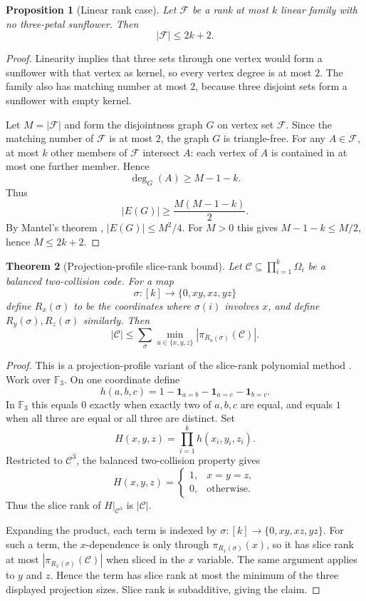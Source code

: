 \documentclass[11pt]{article}
\newtheorem{theorem}{Theorem}[section]
\newtheorem{proposition}[theorem]{Proposition}
\newcommand{\C}{\mathcal C}
\newcommand{\F}{\mathcal F}
\begin{document}
\begin{proposition}[Linear rank case]
\label{prop:linear-case}
Let $\F$ be a rank at most $k$ linear family with no three-petal sunflower.
Then
\[
  |\F|\le 2k+2.
\]
\end{proposition}

\begin{proof}
Linearity implies that three sets through one vertex would form a sunflower
with that vertex as kernel, so every vertex degree is at most $2$.  The family
also has matching number at most $2$, because three disjoint sets form a
sunflower with empty kernel.

Let $M=|\F|$ and form the disjointness graph $G$ on vertex set $\F$.  Since
the matching number of $\F$ is at most $2$, the graph $G$ is triangle-free.
For any $A\in\F$, at most $k$ other members of $\F$ intersect $A$: each vertex
of $A$ is contained in at most one further member.  Hence
\[
  \deg_G(A)\ge M-1-k.
\]
Thus
\[
  |E(G)|\ge \frac{M(M-1-k)}2.
\]
By Mantel's theorem \cite{Mantel07}, $|E(G)|\le M^2/4$.  For $M>0$ this gives
$M-1-k\le M/2$, hence $M\le 2k+2$.
\end{proof}

\begin{theorem}[Projection-profile slice-rank bound]
\label{thm:projection-profile}
Let $\C\subseteq\prod_{i=1}^k\Omega_i$ be a balanced two-collision code.
For a map
\[
  \sigma:[k]\to\{0,xy,xz,yz\}
\]
define $R_x(\sigma)$ to be the coordinates where $\sigma(i)$ involves $x$,
and define $R_y(\sigma),R_z(\sigma)$ similarly.  Then
\[
  |\C|
  \le
  \sum_{\sigma}
  \min_{u\in\{x,y,z\}}|\pi_{R_u(\sigma)}(\C)|.
\]
\end{theorem}

\begin{proof}
This is a projection-profile variant of the slice-rank polynomial method
\cite{CLP17,EG17,Tao16}.
Work over $\mathbb F_3$.  On one coordinate define
\[
  h(a,b,c)=1-\mathbf 1_{a=b}-\mathbf 1_{a=c}-\mathbf 1_{b=c}.
\]
In $\mathbb F_3$ this equals $0$ exactly when exactly two of $a,b,c$ are
equal, and equals $1$ when all three are equal or all three are distinct.
Set
\[
  H(x,y,z)=\prod_{i=1}^k h(x_i,y_i,z_i).
\]
Restricted to $\C^3$, the balanced two-collision property gives
\[
  H(x,y,z)=
  \begin{cases}
  1,&x=y=z,\\
  0,&\text{otherwise}.
  \end{cases}
\]
Thus the slice rank of $H|_{\C^3}$ is $|\C|$.

Expanding the product, each term is indexed by
$\sigma:[k]\to\{0,xy,xz,yz\}$.  For such a term, the $x$-dependence is only
through $\pi_{R_x(\sigma)}(x)$, so it has slice rank at most
$|\pi_{R_x(\sigma)}(\C)|$ when sliced in the $x$ variable.  The same argument
applies to $y$ and $z$.  Hence the term has slice rank at most the minimum of
the three displayed projection sizes.  Slice rank is subadditive, giving the
claim.
\end{proof}
\end{document}
